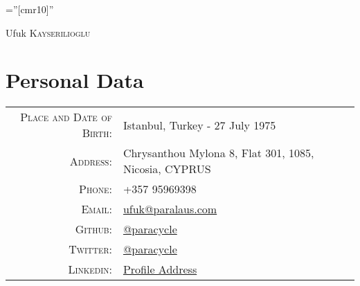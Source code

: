 \documentclass[a4paper,10pt]{article}
\begin{document}
\pagestyle{empty} %

\font\fb=''[cmr10]'' %

\par{\centering
		{\Huge Ufuk \textsc{Kayserilioglu}
	}\bigskip\par}

\section{Personal Data}

\begin{tabular}{rl}
    \textsc{Place and Date of Birth:} & Istanbul, Turkey  - 27 July 1975 \\
    \textsc{Address:}                 & Chrysanthou Mylona 8, Flat 301, 1085, Nicosia, CYPRUS \\
    \textsc{Phone:}                   & +357 95969398 \\
    \textsc{Email:}                   & \href{mailto:ufuk@paralaus.com}{ufuk@paralaus.com} \\
    \textsc{Github:}                  & \href{https://github.com/paracycle}{@paracycle} \\
    \textsc{Twitter:}                 & \href{https://twitter.com/paracycle}{@paracycle} \\
    \textsc{Linkedin:}                & \href{https://www.linkedin.com/in/ufukkayserilioglu}{Profile Address} \\
\end{tabular}

\end{document}
